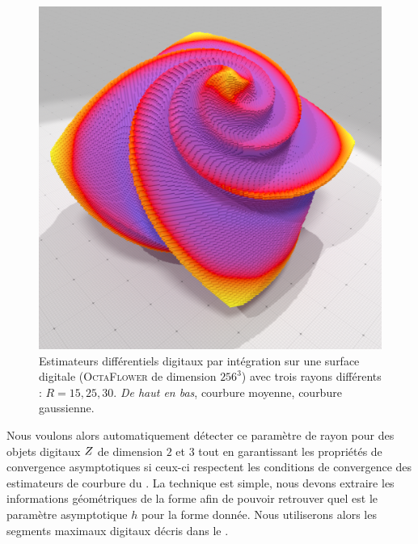 \begin{figure}[ht]
\begin{center}
  \includegraphics[width=.30\linewidth]{images/Curvature/Octa256_Gauss_R_30_0001}
\end{center}\vspace{-0.5cm}
  \caption{Estimateurs différentiels digitaux par intégration sur une surface digitale (\textsc{OctaFlower} de dimension $256^3$) avec trois rayons différents : $R = 15, 25, 30$. \emph{De haut en bas}, courbure moyenne, courbure gaussienne. \label{fig:digital-II-octa-scale}}
\end{figure}
%
Nous voulons alors automatiquement détecter ce paramètre de rayon pour des
objets digitaux $Z$ de dimension $2$ et $3$ tout en garantissant les
propriétés de convergence asymptotiques si ceux-ci respectent les conditions de
convergence des estimateurs de courbure du .
La technique est simple, nous devons extraire les informations géométriques de
la forme afin de pouvoir retrouver quel est le paramètre asymptotique $h$ pour
la forme donnée. Nous utiliserons alors les segments maximaux digitaux décris
dans le .
%
%
